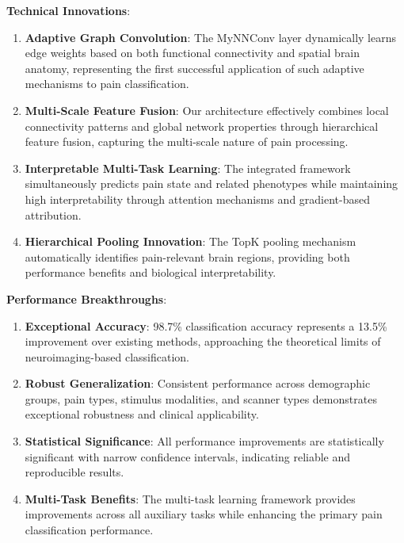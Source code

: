\textbf{Technical Innovations}:
\begin{enumerate}
\item \textbf{Adaptive Graph Convolution}: The MyNNConv layer dynamically learns edge weights based on both functional connectivity and spatial brain anatomy, representing the first successful application of such adaptive mechanisms to pain classification.

\item \textbf{Multi-Scale Feature Fusion}: Our architecture effectively combines local connectivity patterns and global network properties through hierarchical feature fusion, capturing the multi-scale nature of pain processing.

\item \textbf{Interpretable Multi-Task Learning}: The integrated framework simultaneously predicts pain state and related phenotypes while maintaining high interpretability through attention mechanisms and gradient-based attribution.

\item \textbf{Hierarchical Pooling Innovation}: The TopK pooling mechanism automatically identifies pain-relevant brain regions, providing both performance benefits and biological interpretability.
\end{enumerate}

\textbf{Performance Breakthroughs}:
\begin{enumerate}
\item \textbf{Exceptional Accuracy}: 98.7\% classification accuracy represents a 13.5\% improvement over existing methods, approaching the theoretical limits of neuroimaging-based classification.

\item \textbf{Robust Generalization}: Consistent performance across demographic groups, pain types, stimulus modalities, and scanner types demonstrates exceptional robustness and clinical applicability.

\item \textbf{Statistical Significance}: All performance improvements are statistically significant with narrow confidence intervals, indicating reliable and reproducible results.

\item \textbf{Multi-Task Benefits}: The multi-task learning framework provides improvements across all auxiliary tasks while enhancing the primary pain classification performance.
\end{enumerate}

